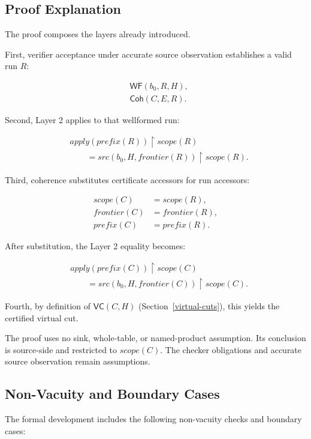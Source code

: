 \documentclass[letterpaper,10pt,twocolumn]{article}
\newcommand{\restrict}{\mathbin{\upharpoonright}}
\newcommand{\Apply}{\mathit{apply}}
\newcommand{\Src}{\mathit{src}}
\newcommand{\Scope}{\mathit{scope}}
\newcommand{\Frontier}{\mathit{frontier}}
\newcommand{\CleanPrefix}{\mathit{prefix}}
\newcommand{\WF}{\mathsf{WF}}
\newcommand{\Coh}{\mathsf{Coh}}
\newcommand{\VC}{\mathsf{VC}}
\begin{document}
\subsection{Proof Explanation}\label{proof-explanation}

The proof composes the layers already introduced.

First, verifier acceptance under accurate source observation establishes a
valid run $R$:

\[
\begin{aligned}
&\WF(b_0,R,H),\\
&\Coh(C,E,R).
\end{aligned}
\]

Second, Layer 2 applies to that wellformed run:

\[
\begin{aligned}
&\Apply(\CleanPrefix(R)) \restrict \Scope(R)\\
&\qquad= \Src(b_0,H,\Frontier(R)) \restrict \Scope(R).
\end{aligned}
\]

Third, coherence substitutes certificate accessors for run accessors:

\[
\begin{aligned}
\Scope(C)&=\Scope(R),\\
\Frontier(C)&=\Frontier(R),\\
\CleanPrefix(C)&=\CleanPrefix(R).
\end{aligned}
\]

After substitution, the Layer 2 equality becomes:

\[
\begin{aligned}
&\Apply(\CleanPrefix(C)) \restrict \Scope(C)\\
&\qquad= \Src(b_0,H,\Frontier(C)) \restrict \Scope(C).
\end{aligned}
\]

Fourth, by definition of $\VC(C,H)$ (Section~\ref{virtual-cuts}),
this yields the certified virtual cut.

The proof uses no sink, whole-table, or named-product assumption. Its
conclusion is source-side and restricted to $\Scope(C)$. The
checker obligations and accurate source observation remain
assumptions.

\subsection{Non-Vacuity and Boundary
Cases}\label{non-vacuity-and-boundary-cases}

The formal development includes the following non-vacuity checks and
boundary cases:
\end{document}
